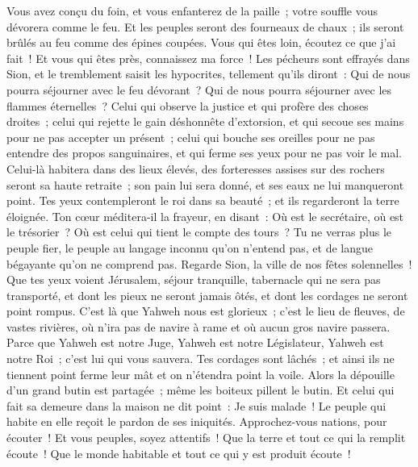 \begin{multicols}{2}
Vous avez conçu du foin, et vous enfanterez de la paille~; votre souffle vous dévorera comme le feu.
Et les peuples seront des fourneaux de chaux~; ils seront brûlés au feu comme des épines coupées.
Vous qui êtes loin, écoutez ce que j'ai fait~! Et vous qui êtes près, connaissez ma force~!
Les pécheurs sont effrayés dans Sion, et le tremblement saisit les hypocrites, tellement qu'ils diront~: Qui de nous pourra séjourner avec le feu dévorant~? Qui de nous pourra séjourner avec les flammes éternelles~?
Celui qui observe la justice et qui profère des choses droites~; celui qui rejette le gain déshonnête d'extorsion, et qui secoue ses mains pour ne pas accepter un présent~; celui qui bouche ses oreilles pour ne pas entendre des propos sanguinaires, et qui ferme ses yeux pour ne pas voir le mal.
Celui-là habitera dans des lieux élevés, des forteresses assises sur des rochers seront sa haute retraite~; son pain lui sera donné, et ses eaux ne lui manqueront point.
Tes yeux contempleront le roi dans sa beauté~; et ils regarderont la terre éloignée.
Ton cœur méditera-il la frayeur, en disant~: Où est le secrétaire, où est le trésorier~? Où est celui qui tient le compte des tours~?
Tu ne verras plus le peuple fier, le peuple au langage inconnu qu'on n'entend pas, et de langue bégayante qu'on ne comprend pas.
Regarde Sion, la ville de nos fêtes solennelles~! Que tes yeux voient Jérusalem, séjour tranquille, tabernacle qui ne sera pas transporté, et dont les pieux ne seront jamais ôtés, et dont les cordages ne seront point rompus.
C'est là que Yahweh nous est glorieux~; c'est le lieu de fleuves, de vastes rivières, où n'ira pas de navire à rame et où aucun gros navire passera.
Parce que Yahweh est notre Juge, Yahweh est notre Législateur, Yahweh est notre Roi~; c'est lui qui vous sauvera.
Tes cordages sont lâchés~; et ainsi ils ne tiennent point ferme leur mât et on n'étendra point la voile. Alors la dépouille d'un grand butin est partagée~; même les boiteux pillent le butin.
Et celui qui fait sa demeure dans la maison ne dit point~: Je suis malade~! Le peuple qui habite en elle reçoit le pardon de ses iniquités.
\VerseOne{}Approchez-vous nations, pour écouter~! Et vous peuples, soyez attentifs~! Que la terre et tout ce qui la remplit écoute~! Que le monde habitable et tout ce qui y est produit écoute~!

\end{multicols}
